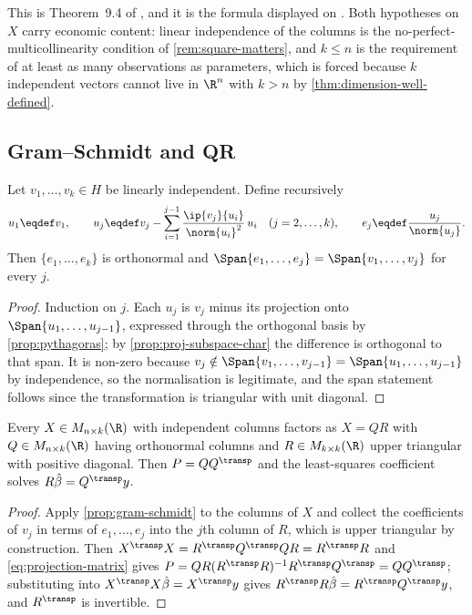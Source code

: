 This is Theorem~9.4 of \textcite[p.~305]{fukuda2026notes}, and it is the
formula displayed on \autocite[slide 62]{fukuda2026calculus}. Both hypotheses on
$X$ carry economic content: linear independence of the columns is the
no-perfect-multicollinearity condition of \autoref{rem:square-matters}, and
$k\leq n$ is the requirement of at least as many observations as parameters,
which is forced because $k$ independent vectors cannot live in $\R^n$ with $k>n$
by \autoref{thm:dimension-well-defined}.

\subsection{Gram--Schmidt and QR}\label{subsec:proj-qr}

\begin{proposition}\label{prop:gram-schmidt}
	Let $v_1,\dots,v_k\in H$ be linearly independent. Define recursively
	\[
		u_1\eqdef v_1,\qquad
		u_j\eqdef v_j-\sum_{i=1}^{j-1}\frac{\ip{v_j}{u_i}}{\norm{u_i}^2}\,u_i
		\quad(j=2,\dots,k),
		\qquad e_j\eqdef\frac{u_j}{\norm{u_j}} .
	\]
	Then $\{e_1,\dots,e_k\}$ is orthonormal and
	$\Span\{e_1,\dots,e_j\}=\Span\{v_1,\dots,v_j\}$ for every $j$.
\end{proposition}

\begin{proof}
	Induction on $j$. Each $u_j$ is $v_j$ minus its projection onto
	$\Span\{u_1,\dots,u_{j-1}\}$, expressed through the orthogonal basis by
	\autoref{prop:pythagoras}; by \autoref{prop:proj-subspace-char} the difference
	is orthogonal to that span. It is non-zero because $v_j\notin
		\Span\{v_1,\dots,v_{j-1}\}=\Span\{u_1,\dots,u_{j-1}\}$ by independence, so
	the normalisation is legitimate, and the span statement follows since the
	transformation is triangular with unit diagonal.
\end{proof}

\begin{corollary}[QR decomposition]\label{cor:qr}
	Every $X\in M_{n\times k}(\R)$ with independent columns factors as $X=QR$ with
	$Q\in M_{n\times k}(\R)$ having orthonormal columns and $R\in M_{k\times k}(\R)$
	upper triangular with positive diagonal. Then
	$P=QQ^{\transp}$ and the least-squares coefficient solves $R\hat\beta=Q^{\transp}y$.
\end{corollary}

\begin{proof}
	Apply \autoref{prop:gram-schmidt} to the columns of $X$ and collect the
	coefficients of $v_j$ in terms of $e_1,\dots,e_j$ into the $j$th column of $R$,
	which is upper triangular by construction. Then
	$X^{\transp}X=R^{\transp}Q^{\transp}QR=R^{\transp}R$ and
	\eqref{eq:projection-matrix} gives
	$P=QR(R^{\transp}R)^{-1}R^{\transp}Q^{\transp}=QQ^{\transp}$; substituting into
	$X^{\transp}X\hat\beta=X^{\transp}y$ gives
	$R^{\transp}R\hat\beta=R^{\transp}Q^{\transp}y$, and $R^{\transp}$ is invertible.
\end{proof}

